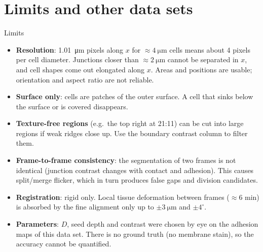 \documentclass[aspectratio=169,9pt]{beamer}
\begin{document}
\section{Limits and other data sets}

\begin{frame}{Limits}
\small
\begin{itemize}
\item \textbf{Resolution}: \SI{1.01}{\micro\metre} pixels along $x$ for $\approx\SI{4}{\micro\metre}$ cells means about 4 pixels per cell diameter. Junctions closer than $\approx\SI{2}{\micro\metre}$ cannot be separated in $x$, and cell shapes come out elongated along $x$. Areas and positions are usable; orientation and aspect ratio are not reliable.
\item \textbf{Surface only}: cells are patches of the outer surface. A cell that sinks below the surface or is covered disappears.
\item \textbf{Texture-free regions} (e.g.\ the top right at 21:11) can be cut into large regions if weak ridges close up. Use the boundary contrast column to filter them.
\item \textbf{Frame-to-frame consistency}: the segmentation of two frames is not identical (junction contrast changes with contact and adhesion). This causes split/merge flicker, which in turn produces false gaps and division candidates.
\item \textbf{Registration}: rigid only. Local tissue deformation between frames ($\approx6$ min) is absorbed by the fine alignment only up to $\pm\SI{3}{\micro\metre}$ and $\pm4^\circ$.
\item \textbf{Parameters}: $D$, seed depth and contrast were chosen by eye on the adhesion maps of this data set. There is no ground truth (no membrane stain), so the accuracy cannot be quantified.
\end{itemize}
\end{frame}
\end{document}
